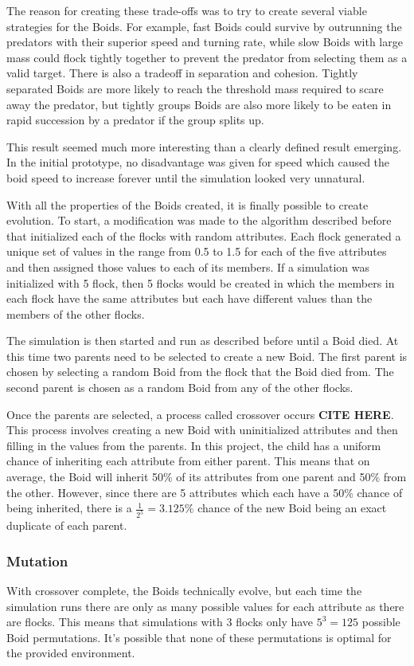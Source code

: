 \documentclass{egpubl}
\begin{document}
The reason for creating these trade-offs was to try to create several viable strategies for the Boids. For example, fast Boids could survive by outrunning the predators with their superior speed and turning rate, while slow Boids with large mass could flock tightly together to prevent the predator from selecting them as a valid target. There is also a tradeoff in separation and cohesion. Tightly separated Boids are more likely to reach the threshold mass required to scare away the predator, but tightly groups Boids are also more likely to be eaten in rapid succession by a predator if the group splits up.
\par
This result seemed much more interesting than a clearly defined result emerging. In the initial prototype, no disadvantage was given for speed which caused the boid speed to increase forever until the simulation looked very unnatural. 
\par
With all the properties of the Boids created, it is finally possible to create evolution. To start, a modification was made to the algorithm described before that initialized each of the flocks with random attributes. Each flock generated a unique set of values in the range from 0.5 to 1.5 for each of the five attributes and then assigned those values to each of its members. If a simulation was initialized with 5 flock, then 5 flocks would be created in which the members in each flock have the same attributes but each have different values than the members of the other flocks.
\par
The simulation is then started and run as described before until a Boid died. At this time two parents need to be selected to create a new Boid. The first parent is chosen by selecting a random Boid from the flock that the Boid died from. The second parent is chosen as a random Boid from any of the other flocks.
\par
Once the parents are selected, a process called crossover occurs \textbf{CITE HERE}. This process involves creating a new Boid with uninitialized attributes and then filling in the values from the parents. In this project, the child has a uniform chance of inheriting each attribute from either parent. This means that on average, the Boid will inherit 50\% of its attributes from one parent and 50\% from the other. However, since there are 5 attributes which each have a 50\% chance of being inherited, there is a $\frac{1}{2^5} = 3.125\%$ chance of the new Boid being an exact duplicate of each parent.
\subsubsection{Mutation}
With crossover complete, the Boids technically evolve, but each time the simulation runs there are only as many possible values for each attribute as there are flocks. This means that simulations with 3 flocks only have $5^3 = 125$ possible Boid permutations. It's possible that none of these permutations is optimal for the provided environment.
\end{document}
